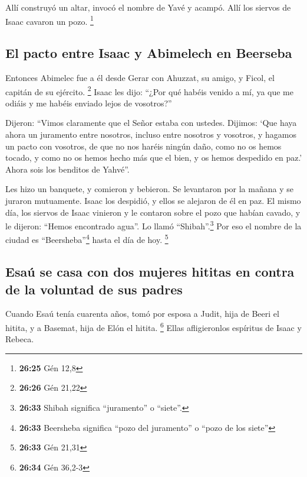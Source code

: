  Allí construyó un altar, invocó el nombre de Yavé y
acampó. Allí los siervos de Isaac cavaron un pozo. \footnote{\textbf{26:25}
  Gén 12,8}

\hypertarget{el-pacto-entre-isaac-y-abimelech-en-beerseba}{%
\subsection{El pacto entre Isaac y Abimelech en
Beerseba}\label{el-pacto-entre-isaac-y-abimelech-en-beerseba}}

 Entonces Abimelec fue a él desde Gerar con Ahuzzat, su
amigo, y Ficol, el capitán de su ejército. \footnote{\textbf{26:26} Gén
  21,22}  Isaac les dijo: ``¿Por qué habéis venido a mí,
ya que me odiáis y me habéis enviado lejos de vosotros?''

 Dijeron: ``Vimos claramente que el Señor estaba con
ustedes. Dijimos: `Que haya ahora un juramento entre nosotros, incluso
entre nosotros y vosotros, y hagamos un pacto con vosotros,
 de que no nos haréis ningún daño, como no os hemos
tocado, y como no os hemos hecho más que el bien, y os hemos despedido
en paz.' Ahora sois los benditos de Yahvé''.

 Les hizo un banquete, y comieron y bebieron.
 Se levantaron por la mañana y se juraron mutuamente.
Isaac los despidió, y ellos se alejaron de él en paz.  El
mismo día, los siervos de Isaac vinieron y le contaron sobre el pozo que
habían cavado, y le dijeron: ``Hemos encontrado agua''. 
Lo llamó ``Shibah''.\footnote{\textbf{26:33} Shibah significa
  ``juramento'' o ``siete''.} Por eso el nombre de la ciudad es
``Beersheba''\footnote{\textbf{26:33} Beersheba significa ``pozo del
  juramento'' o ``pozo de los siete''} hasta el día de hoy. \footnote{\textbf{26:33}
  Gén 21,31}

\hypertarget{esauxfa-se-casa-con-dos-mujeres-hititas-en-contra-de-la-voluntad-de-sus-padres}{%
\subsection{Esaú se casa con dos mujeres hititas en contra de la
voluntad de sus
padres}\label{esauxfa-se-casa-con-dos-mujeres-hititas-en-contra-de-la-voluntad-de-sus-padres}}

 Cuando Esaú tenía cuarenta años, tomó por esposa a
Judit, hija de Beeri el hitita, y a Basemat, hija de Elón el hitita.
\footnote{\textbf{26:34} Gén 36,2-3}  Ellas afligieronlos
espíritus de Isaac y Rebeca.

